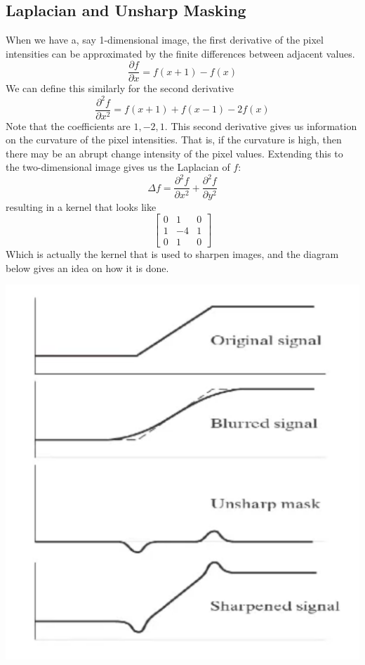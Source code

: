 \documentclass{article}
\begin{document}
  \subsection{Laplacian and Unsharp Masking}

    When we have a, say 1-dimensional image, the first derivative of the pixel intensities can be approximated by the finite differences between adjacent values. 
    \[\frac{\partial f}{\partial x} = f(x + 1) - f(x)\]
    We can define this similarly for the second derivative 
    \[\frac{\partial^2 f}{\partial x^2} = f(x + 1) + f(x - 1) - 2 f(x)\]
    Note that the coefficients are $1, -2, 1$. This second derivative gives us information on the curvature of the pixel intensities. That is, if the curvature is high, then there may be an abrupt change intensity of the pixel values. Extending this to the two-dimensional image gives us the Laplacian of $f$: 
    \[\Delta f = \frac{\partial^2 f}{\partial x^2} + \frac{\partial^2 f}{\partial y^2}\]
    resulting in a kernel that looks like 
    \[\begin{bmatrix} 0 & 1 & 0 \\ 1 & -4 & 1 \\ 0 & 1 & 0 \end{bmatrix}\]
    Which is actually the kernel that is used to sharpen images, and the diagram below gives an idea on how it is done. 
    \begin{center}
        \includegraphics[scale=0.4]{img/sharpen.png}
    \end{center}
\end{document}
